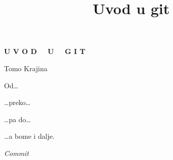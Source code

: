 \documentclass[11pt,twoside,a4paper]{report}
\title{Uvod u git}
\begin{document}
\begin{titlepage}
	\vspace*{1cm}

	\begin{center}
		\Huge \textbf{U V O D \ \ U \ \ G I T}
	\end{center}
	\begin{center}
        Tomo Krajina
	\end{center}

	\vspace*{0.5cm}

	Od\dots

	

	\dots{}preko\dots

	

	\dots{}pa do\dots

	

	\dots{}a bome i dalje.

	\vspace*{1cm}

	\begin{center}
		\emph{Commit}
		
	\end{center}

\end{titlepage}

\pagestyle{plain}

\setcounter{page}{1}

\tableofcontents











%



%
%

\printindex
\end{document}
